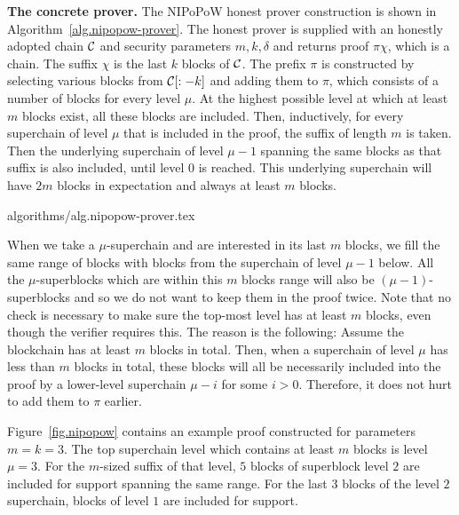 \noindent
\textbf{The concrete prover.}
The NIPoPoW honest prover construction is shown in
Algorithm~\ref{alg.nipopow-prover}. The honest prover is supplied with an
honestly adopted chain $\mathcal{C}$ and security parameters $m, k, \delta$ and
returns proof $\pi\chi$, which is a chain. The suffix $\chi$ is the last $k$
blocks of $\mathcal{C}$. The prefix $\pi$ is constructed by selecting various blocks
from $\mathcal{C}[:-k]$ and adding them to $\pi$, which consists of a number of
blocks for every level $\mu$. At the highest possible level at which at least
$m$ blocks exist, all these blocks are included. Then, inductively, for every
superchain of level $\mu$ that is included in the proof, the suffix of length
$m$ is taken. Then the underlying superchain of level $\mu - 1$ spanning the
same blocks as that suffix is also included, until level $0$ is reached. This
underlying superchain will have $2m$ blocks in expectation and always at least
$m$ blocks.

{algorithms/alg.nipopow-prover.tex}

When we take a $\mu$-superchain and are interested in its last $m$ blocks, we
fill the same range of blocks with blocks from the superchain of level $\mu - 1$
below. All the $\mu$-superblocks which are within this $m$ blocks range
will also be $(\mu-1)$-superblocks and so we do not want to keep them
in the proof twice. Note that no check is necessary to
make sure the top-most level has at least $m$ blocks, even though the verifier
requires this. The reason is the following: Assume the blockchain has at least
$m$ blocks in total. Then, when a superchain of level $\mu$ has less than $m$
blocks in total, these blocks will all be necessarily included into the proof by
a lower-level superchain $\mu - i$ for some $i > 0$. Therefore, it does not hurt
to add them to $\pi$ earlier.

Figure~\ref{fig.nipopow} contains an example proof constructed for parameters
$m = k = 3$. The top superchain level which contains at least $m$ blocks is
level $\mu = 3$. For the $m$-sized suffix of that level, $5$ blocks of
superblock level $2$ are included for support spanning the same range. For the
last $3$ blocks of the level $2$ superchain, blocks of level $1$ are included
for support.

